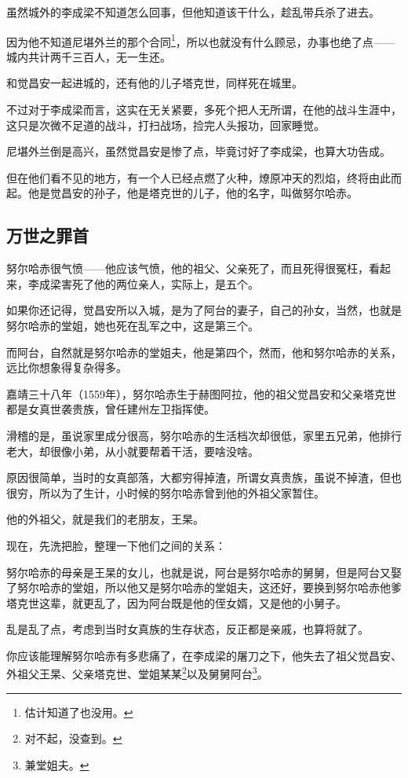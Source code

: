 \begin{multicols}{\theparacolNo}
		虽然城外的李成梁不知道怎么回事，但他知道该干什么，趁乱带兵杀了进去。

		因为他不知道尼堪外兰的那个合同\footnote{估计知道了也没用。}，所以也就没有什么顾忌，办事也绝了点——城内共计两千三百人，无一生还。

		和觉昌安一起进城的，还有他的儿子塔克世，同样死在城里。

		不过对于李成梁而言，这实在无关紧要，多死个把人无所谓，在他的战斗生涯中，这只是次微不足道的战斗，打扫战场，捡完人头报功，回家睡觉。

		尼堪外兰倒是高兴，虽然觉昌安是惨了点，毕竟讨好了李成梁，也算大功告成。

		但在他们看不见的地方，有一个人已经点燃了火种，燎原冲天的烈焰，终将由此而起。他是觉昌安的孙子，他是塔克世的儿子，他的名字，叫做努尔哈赤。

		\subsection{万世之罪首}
		努尔哈赤很气愤——他应该气愤，他的祖父、父亲死了，而且死得很冤枉，看起来，李成梁害死了他的两位亲人，实际上，是五个。

		如果你还记得，觉昌安所以入城，是为了阿台的妻子，自己的孙女，当然，也就是努尔哈赤的堂姐，她也死在乱军之中，这是第三个。

		而阿台，自然就是努尔哈赤的堂姐夫，他是第四个，然而，他和努尔哈赤的关系，远比你想象得复杂得多。

		嘉靖三十八年（1559年），努尔哈赤生于赫图阿拉，他的祖父觉昌安和父亲塔克世都是女真世袭贵族，曾任建州左卫指挥使。

		滑稽的是，虽说家里成分很高，努尔哈赤的生活档次却很低，家里五兄弟，他排行老大，却很像小弟，从小就要帮着干活，要啥没啥。

		原因很简单，当时的女真部落，大都穷得掉渣，所谓女真贵族，虽说不掉渣，但也很穷，所以为了生计，小时候的努尔哈赤曾到他的外祖父家暂住。

		他的外祖父，就是我们的老朋友，王杲。

		现在，先洗把脸，整理一下他们之间的关系：

		努尔哈赤的母亲是王杲的女儿，也就是说，阿台是努尔哈赤的舅舅，但是阿台又娶了努尔哈赤的堂姐，所以他又是努尔哈赤的堂姐夫，这还好，要换到努尔哈赤他爹塔克世这辈，就更乱了，因为阿台既是他的侄女婿，又是他的小舅子。

		乱是乱了点，考虑到当时女真族的生存状态，反正都是亲戚，也算将就了。

		你应该能理解努尔哈赤有多悲痛了，在李成梁的屠刀之下，他失去了祖父觉昌安、外祖父王杲、父亲塔克世、堂姐某某\footnote{对不起，没查到。}以及舅舅阿台\footnote{兼堂姐夫。}。


\end{multicols}
